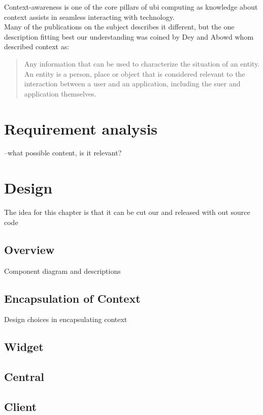 \documentclass[]{report}
\begin{document}
Context-awareness is one of the core pillars of ubi computing as knowledge about context assists in seamless interacting with technology. \\
 

Many of the publications on the subject describes it different, but the one description fitting best our understanding was coined by Dey and Abowd whom described context as:

\blockquote{
	Any information that can be used to characterize the situation of an entity. An entity is a person, place or object that is considered relevant to the interaction between a user and an application, including the suer and application themselves. \cite{Dey and Abowd (2000)} 
} 



  

\chapter{Requirement analysis}

--what possible content, is it relevant?



\chapter{Design}
The idea for this chapter is that it can be cut our and released with out source code

\section{Overview}
Component diagram and descriptions

\section{Encapsulation of Context}
Design choices in encapsulating context

\section{Widget}

\section{Central}

\section{Client}
\end{document}
